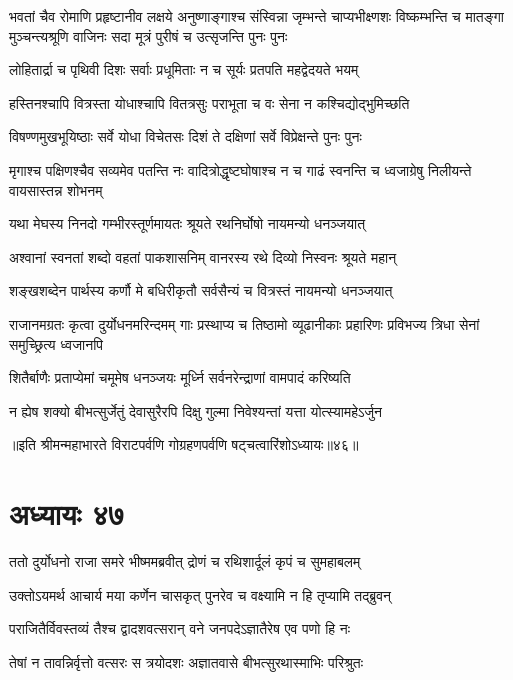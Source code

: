 \onelineshloka
{भवतां चैव रोमाणि प्रहृष्टानीव लक्षये}
\threelineshloka
{अनुष्णाङ्गाश्च संस्विन्ना जृम्भन्ते चाप्यभीक्ष्णशः}
{विष्कम्भन्ति च मातङ्गा मुञ्चन्त्यश्रूणि वाजिनः}
{सदा मूत्रं पुरीषं च उत्सृजन्ति पुनः पुनः}


\twolineshloka
{लोहितार्द्रा च पृथिवी दिशः सर्वाः प्रधूमिताः}
{न च सूर्यः प्रतपति महद्वेदयते भयम्}


\twolineshloka
{हस्तिनश्चापि वित्रस्ता योधाश्चापि वितत्रसुः}
{पराभूता च वः सेना न कश्चिद्योद्भुमिच्छति}


\twolineshloka
{विषण्णमुखभूयिष्ठाः सर्वे योधा विचेतसः}
{दिशं ते दक्षिणां सर्वे विप्रेक्षन्ते पुनः पुनः}


\threelineshloka
{मृगाश्च पक्षिणश्चैव सव्यमेव पतन्ति नः}
{वादित्रोद्धृष्टघोषाश्च न च गाढं स्वनन्ति च}
{ध्वजाग्रेषु निलीयन्ते वायसास्तन्न शोभनम्}


\twolineshloka
{यथा मेघस्य निनदो गम्भीरस्तूर्णमायतः}
{श्रूयते रथनिर्घोषो नायमन्यो धनञ्जयात्}


\twolineshloka
{अश्वानां स्वनतां शब्दो वहतां पाकशासनिम्}
{वानरस्य रथे दिव्यो निस्वनः श्रूयते महान्}


\twolineshloka
{शङ्खशब्देन पार्थस्य कर्णौ मे बधिरीकृतौ}
{सर्वसैन्यं च वित्रस्तं नायमन्यो धनञ्जयात्}


\threelineshloka
{राजानमग्रतः कृत्वा दुर्योधनमरिन्दमम्}
{गाः प्रस्थाप्य च तिष्ठामो व्यूढानीकाः प्रहारिणः}
{प्रविभज्य त्रिधा सेनां समुच्छ्रित्य ध्वजानपि}


\twolineshloka
{शितैर्बाणैः प्रताप्येमां चमूमेष धनञ्जयः}
{मूर्ध्नि सर्वनरेन्द्राणां वामपादं करिष्यति}


\twolineshloka
{न ह्येष शक्यो बीभत्सुर्जेतुं देवासुरैरपि}
{दिक्षु गुल्मा निवेश्यन्तां यत्ता योत्स्यामहेऽर्जुन}

॥इति श्रीमन्महाभारते विराटपर्वणि गोग्रहणपर्वणि षट्चत्वारिंशोऽध्यायः॥४६॥

\chapter{अध्यायः ४७}

\twolineshloka
{ततो दुर्योधनो राजा समरे भीष्ममब्रवीत्}
{द्रोणं च रथिशार्दूलं कृपं च सुमहाबलम्}


\twolineshloka
{उक्तोऽयमर्थ आचार्य मया कर्णेन चासकृत्}
{पुनरेव च वक्ष्यामि न हि तृप्यामि तद्ब्रुवन्}


\twolineshloka
{पराजितैर्विवस्तव्यं तैश्च द्वादशवत्सरान्}
{वने जनपदेऽज्ञातैरेष एव पणो हि नः}


\twolineshloka
{तेषां न तावन्निर्वृत्तो वत्सरः स त्रयोदशः}
{अज्ञातवासे बीभत्सुरथास्माभिः परिश्रुतः}


